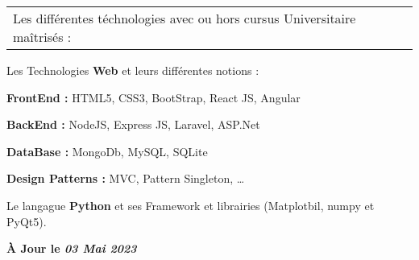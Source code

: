 \documentclass[10pt,A5]{article}
\newcommand{\mpwidth}{\linewidth-\fboxsep-\fboxsep}
\newcommand{\cvlist}[1] {
	\begin{itemize}{#1}\end{itemize}
}
\newcommand{\cvtext}[1] {
	\begin{tabular*}{1\mpwidth}{p{0.98\mpwidth}}
		\parbox{1\mpwidth}{#1}
	\end{tabular*}
}
\begin{document}
\begin{paracol}{2}
\begin{rightcolumn}
\cvtext{Les différentes téchnologies avec ou hors cursus Universitaire maîtrisés : 
\\}
{\cvlist{
		\item Les Technologies \textbf{Web} et leurs différentes notions : 
			\cvlist{
				\item \textbf{FrontEnd :} HTML5, CSS3, BootStrap, React JS, Angular   
				\item \textbf{BackEnd :} NodeJS, Express JS, Laravel, ASP.Net
				\item \textbf{DataBase :} MongoDb, MySQL, SQLite
				\item \textbf{Design Patterns :} MVC, Pattern Singleton, \dots
			}
		\item Le langague \textbf{Python} et ses Framework et librairies (Matplotbil, numpy et PyQt5).
		\begin{center}
			\textbf{À Jour le \textit{03 Mai 2023}}
		\end{center}	
	}}

\mbox{}
\mbox{}
\mbox{}
\mbox{}
\end{rightcolumn}
\end{paracol}
\end{document}
